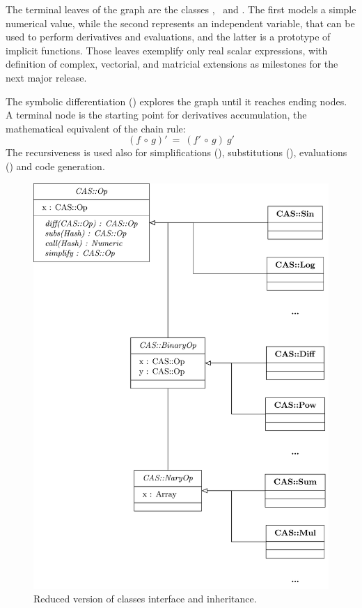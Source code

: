 The terminal leaves of the graph are the classes \CASConstant, \CASVariable~and \CASFunction. The first models a simple numerical value, while the second represents an independent variable, that can be used to perform derivatives and evaluations, and the latter is a prototype of implicit functions. Those leaves exemplify only real scalar expressions, with definition of complex, vectorial, and matricial extensions as milestones for the next major release.

The symbolic differentiation (\CASOpdiff) explores the graph until it reaches ending nodes. A terminal node is the starting point for derivatives accumulation, the mathematical equivalent of the chain rule:
\begin{equation}
\left( f  \, \circ \, g \right)' \: = \:
\left( f' \, \circ \, g \right) \: g'
\end{equation}
The recursiveness is used also for simplifications (\CASOpsimplify), substitutions (\CASOpsubs), evaluations (\CASOpcall) and code generation.

\begin{figure}[ht!]
\centering
%
\includegraphics{img/class-struct.png}
\caption{\label{fig:uml-container}Reduced version of classes interface and inheritance. }
\end{figure}

